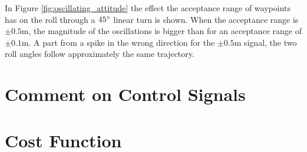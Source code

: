 In Figure \ref{fig:oscillating_attitude} the effect the acceptance range of waypoints has on the roll through a $45\degree$ linear turn is shown. When the acceptance range is $\pm 0.5$m, the magnitude of the oscillations is bigger than for an acceptance range of $\pm 0.1$m. A part from a spike in the wrong direction for the $\pm 0.5$m signal, the two roll angles follow approximately the same trajectory.


\section{Comment on Control Signals}


\section{Cost Function}